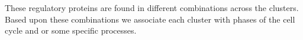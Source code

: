 \documentclass[]{article}
\begin{document}
%
% 
%
These regulatory proteins are found in different combinations across the clusters. Based upon these combinations we associate each cluster with phases of the cell cycle and or some specific processes.
\end{document}
